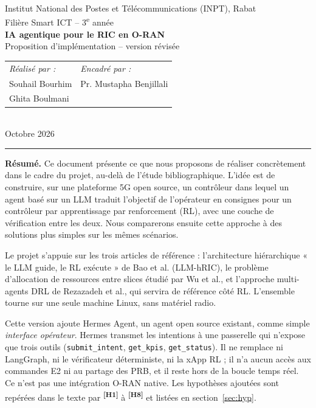 \documentclass[11pt,a4paper]{article}
\newcommand{\hyp}[1]{\textsuperscript{\textbf{[H#1]}}}
\newcommand{\tool}[1]{\texttt{#1}}
\begin{document}
\thispagestyle{plain}
\begin{center}
  {\small Institut National des Postes et Télécommunications (INPT), Rabat\\
  Filière Smart ICT -- 3\textsuperscript{e} année}\\[1.2em]
  {\LARGE\bfseries IA agentique pour le RIC en O-RAN}\\[0.4em]
  {\large Proposition d'implémentation -- version révisée}\\[1.2em]
  \begin{tabular}{@{}l@{\hspace{3em}}l@{}}
    \textit{Réalisé par :} & \textit{Encadré par :}\\
    Souhail Bourhim & Pr. Mustapha Benjillali\\
    Ghita Boulmani & \\
  \end{tabular}\\[1em]
  {\small Octobre 2026}
\end{center}
\vspace{0.5em}
\hrule
\vspace{0.8em}

\textbf{Résumé.} Ce document présente ce que nous proposons de réaliser concrètement
dans le cadre du projet, au-delà de l'étude bibliographique. L'idée est de construire,
sur une plateforme 5G open source, un contrôleur dans lequel un agent basé sur un LLM
traduit l'objectif de l'opérateur en consignes pour un contrôleur par apprentissage par
renforcement (RL), avec une couche de vérification entre les deux. Nous comparerons
ensuite cette approche à des solutions plus simples sur les mêmes scénarios.

Le projet s'appuie sur les trois articles de référence : l'architecture hiérarchique
« le LLM guide, le RL exécute » de Bao et al. (LLM-hRIC), le problème d'allocation de
ressources entre slices étudié par Wu et al., et l'approche multi-agents DRL de
Rezazadeh et al., qui servira de référence côté RL. L'ensemble tourne sur une seule
machine Linux, sans matériel radio.

Cette version ajoute Hermes Agent, un agent open source existant, comme simple
\emph{interface opérateur}. Hermes transmet les intentions à une passerelle qui n'expose
que trois outils (\tool{submit\_intent}, \tool{get\_kpis}, \tool{get\_status}). Il ne remplace
ni LangGraph, ni le vérificateur déterministe, ni la xApp RL ; il n'a aucun accès aux
commandes E2 ni au partage des PRB, et il reste hors de la boucle temps réel. Ce n'est
pas une intégration O-RAN native. Les hypothèses ajoutées sont repérées dans le texte par
\hyp{1} à \hyp{8} et listées en section~\ref{sec:hyp}.
\end{document}
